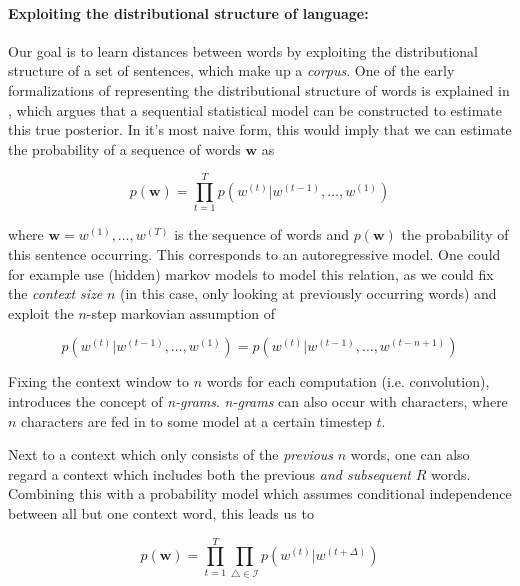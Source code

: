 \documentclass[a4paper,12pt,oneside,openright]{report}
\begin{document}
\paragraph{Exploiting the distributional structure of language:} Our goal is to learn distances between words by exploiting the distributional structure of a set of sentences, which make up a \textit{corpus}. 
One of the early formalizations of representing the distributional structure of words is explained in \cite{bengio03}, which argues that a sequential statistical model can be constructed to estimate this true posterior.  
In it's most naive form, this would imply that we can estimate the probability of a sequence of words $\mathbf{w}$ as

\begin{equation}
p(\mathbf{w}) = \prod_{t=1}^T p\left( w^{(t)} | w^{(t -1)}, \ldots, w^{(1)} \right)
\label{eq:naive_sequential_probability}
\end{equation}

where $\mathbf{w} = w^{(1)}, \dots, w^{(T)} $ is the sequence of words and $p(\mathbf{w})$ the probability of this sentence occurring.
This corresponds to an autoregressive model.
One could for example use (hidden) markov models to model this relation, as we could fix the \textit{context size} $n$ (in this case, only looking at previously occurring words) and exploit the $n$-step markovian assumption of

\begin{equation}
p\left( w^{(t)} | w^{(t -1)}, \ldots, w^{(1)} \right) = p\left( w^{(t)} | w^{(t -1)}, \ldots, w^{(t - n + 1)} \right)
\end{equation}\label{eq:naive_sequential_probability_markovian}

Fixing the context window to $n$ words for each computation (i.e. convolution), introduces the concept of \textit{n-grams}. 
\textit{n-grams} can also occur with characters, where $n$ characters are fed in to some model at a certain timestep $t$.

Next to a context which only consists of the \textit{previous} $n$ words, one can also regard a context which includes both the previous \textit{and subsequent} $R$ words. 
Combining this with a probability model which assumes conditional independence between all but one context word, this leads us to

\begin{equation}
p(\mathbf{w})=\prod_{t=1}^{T} \prod_{\triangle \in \mathcal{I} } p\left( w^{(t)} | w^{(t +\Delta)}\right)
\label{eq:naive_coocurrence_probability}
\end{equation}
\end{document}

